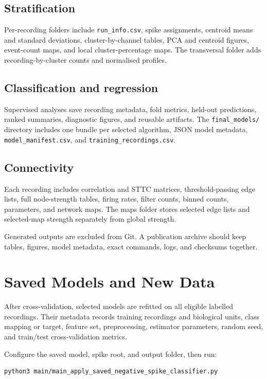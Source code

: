 \documentclass[11pt,a4paper]{article}
\newcommand{\code}[1]{\texttt{#1}}
\begin{document}
\subsection{Stratification}

Per-recording folders include \code{run\_info.csv}, spike assignments, centroid
means and standard deviations, cluster-by-channel tables, PCA and centroid
figures, event-count maps, and local cluster-percentage maps. The transversal
folder adds recording-by-cluster counts and normalised profiles.

\subsection{Classification and regression}

Supervised analyses save recording metadata, fold metrics, held-out predictions,
ranked summaries, diagnostic figures, and reusable artifacts. The
\code{final\_models/} directory includes one bundle per selected algorithm,
JSON model metadata, \code{model\_manifest.csv}, and
\code{training\_recordings.csv}.

\subsection{Connectivity}

Each recording includes correlation and STTC matrices, threshold-passing edge
lists, full node-strength tables, firing rates, filter counts, binned counts,
parameters, and network maps. The maps folder stores selected edge lists and
selected-map strength separately from global strength.

Generated outputs are excluded from Git. A publication archive should keep
tables, figures, model metadata, exact commands, logs, and checksums together.

\section{Saved Models and New Data}

After cross-validation, selected models are refitted on all eligible labelled
recordings. Their metadata records training recordings and biological units,
class mapping or target, feature set, preprocessing, estimator parameters,
random seed, and train/test cross-validation metrics.

Configure the saved model, spike root, and output folder, then run:

\begin{lstlisting}
python3 main/main_apply_saved_negative_spike_classifier.py
\end{lstlisting}
\end{document}
